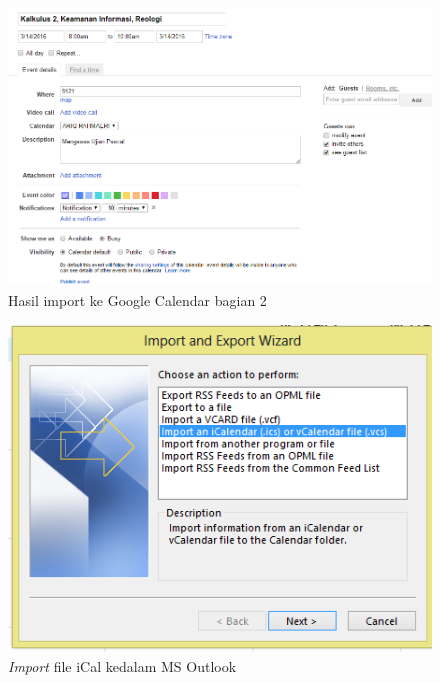		\begin{figure}[H]
		\centering
		\includegraphics[scale=0.5]{Gambar/hasilGC2}
		\caption{Hasil import ke Google Calendar bagian 2 }
		\label{fig:hasilGC2}
		\end{figure}
		

			\begin{figure}[H]
			\centering
			\includegraphics[scale=0.8]{Gambar/importOutlook}
			\caption{\textit{Import} file iCal kedalam MS Outlook }
			\label{fig:importOutlook}
			\end{figure}
		
